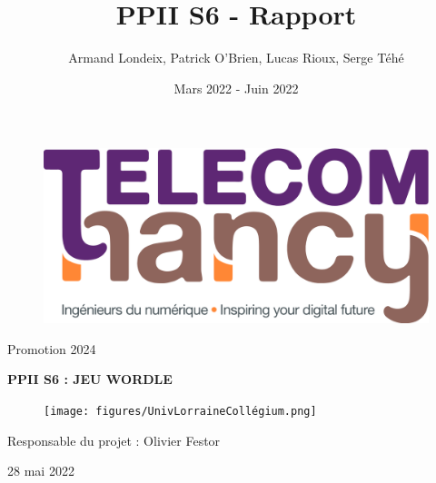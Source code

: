 \documentclass{article}
\title{PPII S6 - Rapport}
\author{Armand Londeix, Patrick O'Brien, Lucas Rioux, Serge Téhé}
\date{Mars 2022 - Juin 2022}
\begin{document}
\begin{figure}
    \centering
    \includegraphics[scale=0.15]{figures/logo_TNCY.png}
\end{figure}
\maketitle
\begin{center}
\large{Promotion 2024}
\end{center}

\noindent\makebox[\linewidth]{\rule{\paperwidth}{2pt}}
\bigbreak
\bigbreak
\bigbreak
\bigbreak

\begin{center}
\begin{Large}
\Huge\textsc{\textbf{PPII S6 : JEU WORDLE}}
\end{Large}
\end{center}
\bigbreak
\bigbreak
\bigbreak
\bigbreak
\noindent\makebox[\linewidth]{\rule{\paperwidth}{2pt}}

\bigbreak
\bigbreak
\begin{figure}[h!]
    \centering
    \texttt{[image: figures/UnivLorraineCollégium.png]}
\end{figure}

\begin{center}
\begin{Large}
Responsable du projet : Olivier Festor
                         

\end{Large}
\end{center}

\bigbreak
\bigbreak
\bigbreak
\bigbreak
\begin{center}
\large{28 mai 2022}
\end{center}

\newpage
\bigbreak
\bigbreak
\bigbreak
\bigbreak

\renewcommand{\contentsname}{Sommaire}
\tableofcontents{}
\newpage
\end{document}
